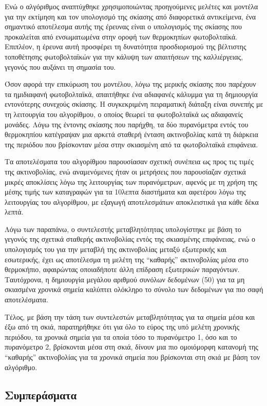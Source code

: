 \documentclass[12pt, a4paper]{report} %
\begin{document}
Ενώ ο αλγόριθμος αναπτύχθηκε χρησιμοποιώντας προηγούμενες μελέτες και μοντέλα για την εκτίμηση και τον υπολογισμό της 
σκίασης από διαφορετικά αντικείμενα, ένα σημαντικό αποτέλεσμα αυτής της έρευνας είναι ο υπολογισμός της σκίασης που 
προκαλείται από ενσωματωμένα στην οροφή των θερμοκηπίων φωτοβολταϊκά. Επιπλέον, η έρευνα αυτή προσφέρει τη δυνατότητα 
προσδιορισμού της βέλτιστης τοποθέτησης φωτοβολταϊκών για την κάλυψη των απαιτήσεων της καλλιέργειας, γεγονός που αυξάνει 
τη σημασία του.

Όσον αφορά την επικύρωση του μοντέλου, λόγω της μερικής σκίασης που παρέχουν τα ημιδιαφανή φωτοβολταϊκά, απαιτήθηκε ένα 
αδιαφανές κάλυμμα για τη δημιουργία εντονότερης συνεχούς σκίασης. Η συγκεκριμένη πειραματική διάταξη είναι συνεπής με τη 
λειτουργία του αλγορίθμου, ο οποίος θεωρεί τα φωτοβολταϊκά ως αδιαφανείς μονάδες. Λόγω της έντονης σκίασης που παρήχθη, 
τα δύο πυρανόμετρα εντός του θερμοκηπίου κατέγραψαν μια αρκετά σταθερή ένταση ακτινοβολίας κατά τη διάρκεια της περιόδου 
που βρίσκονταν μέσα στην σκιασμένη από τα φωτοβολταϊκά επιφάνεια.

Τα αποτελέσματα του αλγορίθμου παρουσίασαν σχετική συνέπεια ως προς τις τιμές της ακτινοβολίας, ενώ αναμενόμενες ήταν οι 
μετρήσεις που παρουσίαζαν σχετικά μικρές αποκλίσεις λόγω της λειτουργίας των πυρανόμετρων, αφενός με τη χρήση της μέσης 
τιμής των καταγραφών για τα 10λεπτα διαστήματα και αφετέρου λόγω της λειτουργίας του αλγορίθμου, με εξαγωγή αποτελεσμάτων 
αποκλειστικά για κάθε δέκα λεπτά.

Λόγω των παραπάνω, ο συντελεστής μεταβλητότητας υπολογίστηκε με βάση το γεγονός της σχετικά σταθερής ακτινοβολίας εντός 
της σκιασμένης επιφάνειας, ενώ ο υπολογισμός του για την μεταβλή της ακτινοβολίας μεταξύ εξωτερικής και εσωτερικής, έχει 
ως αποτέλεσμα τη μελέτη της “καθαρής” ακτινοβολίας μέσα στο θερμοκήπιο, αφαιρώντας οποιαδήποτε άλλη επίδραση εξωτερικών 
παραγόντων. Ταυτόχρονα, η δημιουργία μεγάλου αριθμού συνόλων δεδομένων (50) για τα μη σκιασμένα χρονικά σημεία καλύπτει 
ολόκληρο το σύνολο των δεδομένων για πιο σαφή αποτελέσματα.

Τέλος, με βάση την τάση των συντελεστών μεταβλητότητας για τα σημεία μέσα και έξω από τη σκιά, παρατηρήθηκε ότι για όλο 
το εύρος της υπό μελέτη χρονικής περιόδου, τα χρονικά σημεία για τα οποία τόσο το πυρανόμετρο 1, όσο και το πυρανόμετρο 
2, βρίσκονται μέσα στη σκιά, δίνουν μια πιο ομοιόμορφη κατανομή της “καθαρής” ακτινοβολίας για τα χρονικά σημεία που 
βρίσκονται στη σκιά με βάση τον αλγόριθμο.

\subsection{Συμπεράσματα}\label{sub_alg_concl}
\end{document}

